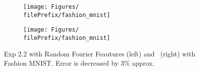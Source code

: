\begin{figure}[H]
  \centering
  \renewcommand{\filePrefix}{\undPrefix/rff}
  \begin{subfigure}[t]{0.5\linewidth}
    \centering\captionsetup{width=.8\linewidth}\texttt{[image: Figures/\\filePrefix/fashion\_mnist]}
    \label{fig:\undPrefix_vowel}
  \end{subfigure}%
  \renewcommand{\filePrefix}{\undPrefix/nys}%
  \begin{subfigure}[t]{0.5\linewidth}
    \centering\captionsetup{width=.8\linewidth}\texttt{[image: Figures/\\filePrefix/fashion\_mnist]}
    \label{fig:\undPrefix_vowel}
  \end{subfigure}
  \caption*{Exp 2.2 with Random Fourier Feautures (left) and \Nys\ (right)
  with Fashion MNIST. Error is decreased by 3\% approx.}
\end{figure}









